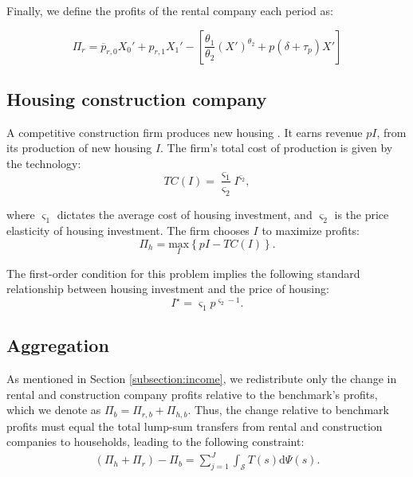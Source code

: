 \documentclass[parskip=full]{article}
\begin{document}
Finally, we define the profits of the rental company each period as:

\begin{equation}
    \Pi_r=\overline{p}_{r,0}X_0'+p_{r,1} X_1'-\left[\frac{\theta_1}{\theta_2}(X')^{\theta_2}+p(\delta+\tau_p) X'\right]
\end{equation}

\subsection{Housing construction company}\label{sec:construction_company}

A competitive construction firm produces new housing \citep{rotberg-2022}. It earns revenue $pI$, from its production of new housing $I$. The firm's total cost of production is given by the technology:
\begin{equation*}
TC(I)=\frac{\varsigma_{1}}{\varsigma_{2}}I^{\varsigma_{2}}\label{eq:total_cost_structure},
\end{equation*}

\noindent where $\varsigma_{1}$ dictates the average cost of housing investment, and $\varsigma_{2}$ is the price elasticity of housing investment. The firm chooses $I$ to maximize profits:
\begin{equation*}
\label{eq:construction_company_profits}
\Pi_h= \underset{I} {\text{$\mbox{max}$}}{\left\{p I-TC(I)\right\}}.
\end{equation*}

\noindent The first-order condition for this problem implies the following standard relationship between housing investment and the price of housing:
\begin{equation}
\label{eq:construction_company_first_order_condition}
I^{\star}=\varsigma_{1} p^{\varsigma_{2}-1}.
\end{equation}

\subsection{Aggregation}\label{subsection:aggregation}

As mentioned in Section \ref{subsection:income}, we redistribute only the change in rental and construction company profits relative to the benchmark's profits, which we denote as $\Pi_b=\Pi_{r,b}+\Pi_{h,b}$. Thus, the change relative to benchmark profits must equal the total lump-sum transfers from rental and construction companies to households, leading to the following constraint:
\begin{align}\label{eq:rebates}
   (\Pi_h+\Pi_r)-\Pi_b=\sum_{j=1}^J \int_\mathcal{S} T(s)\mathrm{d}\Psi(s).
\end{align}
\end{document}
